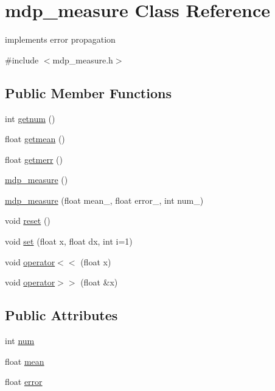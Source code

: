 \hypertarget{classmdp__measure}{}\section{mdp\+\_\+measure Class Reference}
\label{classmdp__measure}


implements error propagation  




{\ttfamily \#include $<$mdp\+\_\+measure.\+h$>$}

\subsection*{Public Member Functions}
\begin{DoxyCompactItemize}
\item 
int \hyperlink{classmdp__measure_af4311b3d6f7aeedd30df26c805df74d9}{getnum} ()
\item 
float \hyperlink{classmdp__measure_a6ac1b96bc356ea6b614a672b06dab833}{getmean} ()
\item 
float \hyperlink{classmdp__measure_a7661cd0bdff2e5f4a2054ef5c3446cb1}{getmerr} ()
\item 
\hyperlink{classmdp__measure_a27caa03e148574a5e3e13b587212bc6a}{mdp\+\_\+measure} ()
\item 
\hyperlink{classmdp__measure_a861159da4e045611fa06b937c63d91ab}{mdp\+\_\+measure} (float mean\+\_\+, float error\+\_\+, int num\+\_)
\item 
void \hyperlink{classmdp__measure_ae03b11fdcba09eefb70134030b863cf6}{reset} ()
\item 
void \hyperlink{classmdp__measure_a5f6d47b2303eea323f511019404621a2}{set} (float x, float dx, int i=1)
\item 
void \hyperlink{classmdp__measure_ad1714e31ad9a1473c05f4aeeab9634e4}{operator$<$$<$} (float x)
\item 
void \hyperlink{classmdp__measure_a3d8873e8abbae44011ddcd69d23e0c9d}{operator$>$$>$} (float \&x)
\end{DoxyCompactItemize}
\subsection*{Public Attributes}
\begin{DoxyCompactItemize}
\item 
int \hyperlink{classmdp__measure_aca5ab38b4f8c43639b2754947c4e4b25}{num}
\item 
float \hyperlink{classmdp__measure_a105996437f8864a761c17dfa308a73f0}{mean}
\item 
float \hyperlink{classmdp__measure_ac0e564a7fdfa4785e8ca77569a2c37e4}{error}
\end{DoxyCompactItemize}
